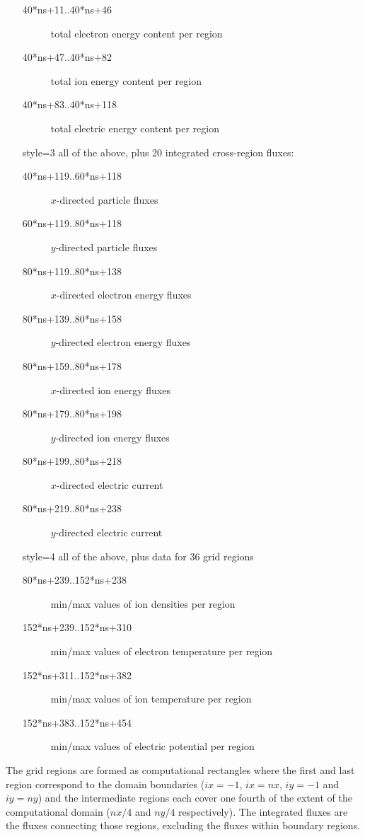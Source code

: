 \documentclass[a4paper,10pt]{report}
\begin{document}
\begin{enumerate}
\begin{description}
      \item[40*ns+11..40*ns+46] total electron energy content per region
      \item[40*ns+47..40*ns+82] total ion energy content per region
      \item[40*ns+83..40*ns+118] total electric energy content per region
    \end{description}
  \item[style=3] all of the above, plus 20 integrated cross-region fluxes:
    \begin{description}
      \item[40*ns+119..60*ns+118] $x$-directed particle fluxes
      \item[60*ns+119..80*ns+118] $y$-directed particle fluxes
      \item[80*ns+119..80*ns+138] $x$-directed electron energy fluxes
      \item[80*ns+139..80*ns+158] $y$-directed electron energy fluxes
      \item[80*ns+159..80*ns+178] $x$-directed ion energy fluxes
      \item[80*ns+179..80*ns+198] $y$-directed ion energy fluxes
      \item[80*ns+199..80*ns+218] $x$-directed electric current
      \item[80*ns+219..80*ns+238] $y$-directed electric current
    \end{description}
  \item[style=4] all of the above, plus data for 36 grid regions
    \begin{description}
      \item[ 80*ns+239..152*ns+238] min/max values of ion densities per region
      \item[152*ns+239..152*ns+310] min/max values of electron temperature per region
      \item[152*ns+311..152*ns+382] min/max values of ion temperature per region
      \item[152*ns+383..152*ns+454] min/max values of electric potential per region
    \end{description}
\end{enumerate}
The grid regions are formed as computational rectangles where the first and last region
correspond to the domain boundaries ($ix=-1$, $ix=nx$, $iy=-1$ and $iy=ny$) and the
intermediate regions each cover one fourth of the extent of the computational domain
($nx/4$ and $ny/4$ respectively). The integrated fluxes are the fluxes connecting
those regions, excluding the fluxes within boundary regions.
\end{document}
